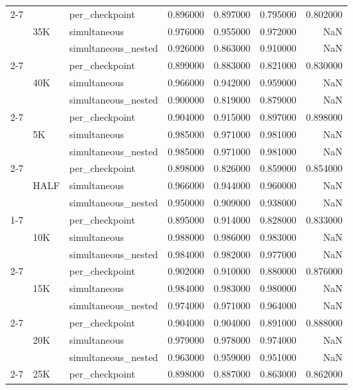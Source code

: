 \begin{tabular}{lllrrrr}
\cline{2-7}
 & \multirow[t]{3}{*}{35K} & per\_checkpoint & 0.896000 & 0.897000 & 0.795000 & 0.802000 \\
 &  & simultaneous & 0.976000 & 0.955000 & 0.972000 & NaN \\
 &  & simultaneous\_nested & 0.926000 & 0.863000 & 0.910000 & NaN \\
\cline{2-7}
 & \multirow[t]{3}{*}{40K} & per\_checkpoint & 0.899000 & 0.883000 & 0.821000 & 0.830000 \\
 &  & simultaneous & 0.966000 & 0.942000 & 0.959000 & NaN \\
 &  & simultaneous\_nested & 0.900000 & 0.819000 & 0.879000 & NaN \\
\cline{2-7}
 & \multirow[t]{3}{*}{5K} & per\_checkpoint & 0.904000 & 0.915000 & 0.897000 & 0.898000 \\
 &  & simultaneous & 0.985000 & 0.971000 & 0.981000 & NaN \\
 &  & simultaneous\_nested & 0.985000 & 0.971000 & 0.981000 & NaN \\
\cline{2-7}
 & \multirow[t]{3}{*}{HALF} & per\_checkpoint & 0.898000 & 0.826000 & 0.859000 & 0.854000 \\
 &  & simultaneous & 0.966000 & 0.944000 & 0.960000 & NaN \\
 &  & simultaneous\_nested & 0.950000 & 0.909000 & 0.938000 & NaN \\
\cline{1-7} \cline{2-7}
\multirow[t]{27}{*}{Chicago} & \multirow[t]{3}{*}{10K} & per\_checkpoint & 0.895000 & 0.914000 & 0.828000 & 0.833000 \\
 &  & simultaneous & 0.988000 & 0.986000 & 0.983000 & NaN \\
 &  & simultaneous\_nested & 0.984000 & 0.982000 & 0.977000 & NaN \\
\cline{2-7}
 & \multirow[t]{3}{*}{15K} & per\_checkpoint & 0.902000 & 0.910000 & 0.880000 & 0.876000 \\
 &  & simultaneous & 0.984000 & 0.983000 & 0.980000 & NaN \\
 &  & simultaneous\_nested & 0.974000 & 0.971000 & 0.964000 & NaN \\
\cline{2-7}
 & \multirow[t]{3}{*}{20K} & per\_checkpoint & 0.904000 & 0.904000 & 0.891000 & 0.888000 \\
 &  & simultaneous & 0.979000 & 0.978000 & 0.974000 & NaN \\
 &  & simultaneous\_nested & 0.963000 & 0.959000 & 0.951000 & NaN \\
\cline{2-7}
 & \multirow[t]{3}{*}{25K} & per\_checkpoint & 0.898000 & 0.887000 & 0.863000 & 0.862000 \\

\end{tabular}

